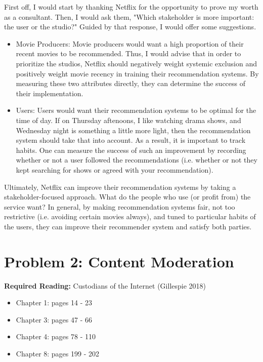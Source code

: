 \documentclass{article}
\begin{document}
\bigskip
\begin{mdframed}

    First off, I would start by thanking Netflix for the opportunity to prove my worth as a consultant. Then, I would ask them, "Which stakeholder is more important: the user or the studio?" Guided by that response, I would offer some suggestions.

    \begin{itemize}
        \item Movie Producers: Movie producers would want a high proportion of their recent movies to be recommended. Thus, I would advise that in order to prioritize the studios, Netflix should negatively weight systemic exclusion and positively weight movie recency in training their recommendation systems. By measuring these two attributes directly, they can determine the success of their implementation.
        \item Users: Users would want their recommendation systems to be optimal for the time of day. If on Thursday aftenoons, I like watching drama shows, and Wednesday night is something a little more light, then the recommendation system should take that into account. As a result, it is important to track habits. One can measure the success of such an improvement by recording whether or not a user followed the recommendations (i.e. whether or not they kept searching for shows or agreed with your recommendation).
    \end{itemize}

    Ultimately, Netflix can improve their recommendation systems by taking a stakeholder-focused approach. What do the people who use (or profit from) the service want?  In general, by making recommendation systems fair, not too restrictive (i.e. avoiding certain movies always), and tuned to particular habits of the users, they can improve their recommender system and satisfy both parties. 

\end{mdframed}
\bigskip


\clearpage

\section*{Problem 2: Content Moderation}

\textbf{Required Reading:} Custodians of the Internet (Gillespie 2018)
\begin{itemize}
\item Chapter 1: pages 14 - 23
\item Chapter 3: pages 47 - 66
\item Chapter 4: pages 78 - 110
\item Chapter 8: pages 199 - 202
\end{itemize}
\end{document}
